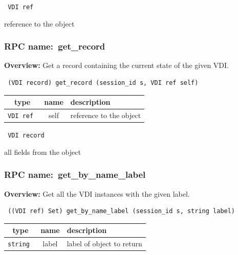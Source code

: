 {\tt 
VDI ref
}


reference to the object
\vspace{0.3cm}
\vspace{0.3cm}
\vspace{0.3cm}
\subsubsection{RPC name:~get\_record}

{\bf Overview:} 
Get a record containing the current state of the given VDI.

\begin{verbatim} (VDI record) get_record (session_id s, VDI ref self)\end{verbatim}



 
\vspace{0.3cm}
\begin{tabular}{|c|c|p{7cm}|}
 \hline
{\bf type} & {\bf name} & {\bf description} \\ \hline
{\tt VDI ref } & self & reference to the object \\ \hline 

\end{tabular}

\vspace{0.3cm}

{\tt 
VDI record
}


all fields from the object
\vspace{0.3cm}
\vspace{0.3cm}
\vspace{0.3cm}
\subsubsection{RPC name:~get\_by\_name\_label}

{\bf Overview:} 
Get all the VDI instances with the given label.

\begin{verbatim} ((VDI ref) Set) get_by_name_label (session_id s, string label)\end{verbatim}



 
\vspace{0.3cm}
\begin{tabular}{|c|c|p{7cm}|}
 \hline
{\bf type} & {\bf name} & {\bf description} \\ \hline
{\tt string } & label & label of object to return \\ \hline 

\end{tabular}

